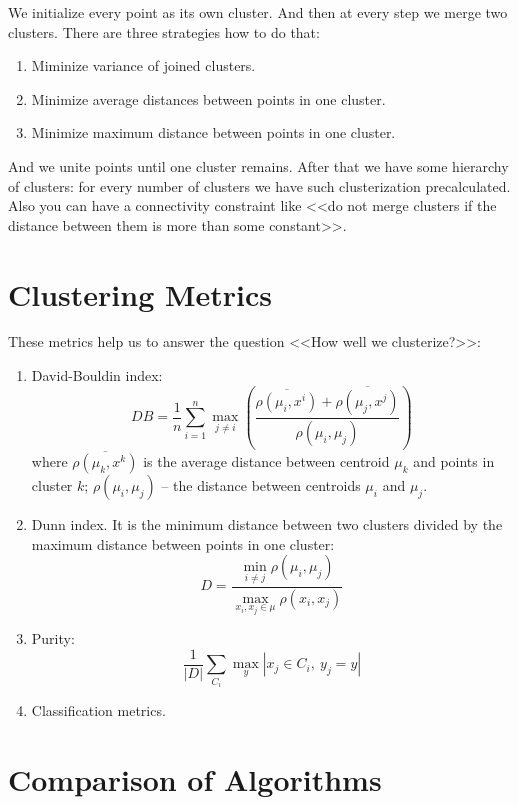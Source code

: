 We initialize every point as its own cluster. And then at every step we merge two clusters. There are three strategies how to do that:
\begin{enumerate}
	\item Miminize variance of joined clusters.
	\item Minimize average distances between points in one cluster.
	\item Minimize maximum distance between points in one cluster.
\end{enumerate}
And we unite points until one cluster remains. After that we have some hierarchy of clusters: for every number of clusters we have such clusterization precalculated.\\
Also you can have a connectivity constraint like <<do not merge clusters if the distance between them is more than some constant>>.

\section{Clustering Metrics}

These metrics help us to answer the question <<How well we clusterize?>>:
\begin{enumerate}
	\item David-Bouldin index: $$DB=\frac{1}{n}\sum\limits_{i=1}^{n}\max\limits_{j\ne i}\left(\frac{\overline{\rho(\mu_i,x^i)}+\overline{\rho(\mu_j,x^j)}}{\rho(\mu_i,\mu_j)}\right)$$ where $\overline{\rho(\mu_k,x^k)}$ is the average distance between centroid $\mu_k$ and points in cluster $k$; $\rho(\mu_i,\mu_j)$ -- the distance between centroids $\mu_i$ and $\mu_j$.
	\item Dunn index. It is the minimum distance between two clusters divided by the maximum distance between points in one cluster: $$D=\frac{\min\limits_{i\ne j}\rho(\mu_i,\mu_j)}{\max\limits_{x_i,x_j\in\mu}\rho(x_i,x_j)}$$
	\item Purity: $$\frac{1}{|D|}\sum\limits_{C_i}\max\limits_{y}|x_j\in C_i,\ y_j=y|$$
	\item Classification metrics.
\end{enumerate}

\section{Comparison of Algorithms}

